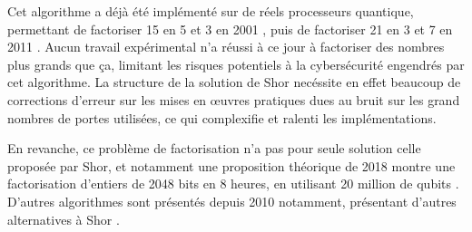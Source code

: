 \medbreak

Cet algorithme a déjà été implémenté sur de réels processeurs quantique, permettant de factoriser 15 en 5 et 3 en 2001 \cite{Vandersypen01}, puis de factoriser 21 en 3 et 7 en 2011 \cite{Martin11}. Aucun travail expérimental n'a réussi à ce jour à factoriser des nombres plus grands que ça, limitant les risques potentiels à la cybersécurité engendrés par cet algorithme. La structure de la solution de Shor necéssite en effet beaucoup de corrections d'erreur sur les mises en \oe{}uvres pratiques dues au bruit sur les grand nombres de portes utilisées, ce qui complexifie et ralenti les implémentations.

En revanche, ce problème de factorisation n'a pas pour seule solution celle proposée par Shor, et notamment une proposition théorique de 2018 montre une factorisation d'entiers de 2048 bits en 8 heures, en utilisant 20 million de qubits \cite{gidney2019factor}. D'autres algorithmes sont présentés depuis 2010 notamment, présentant d'autres alternatives à Shor \cite{anschuetz2018variational}.